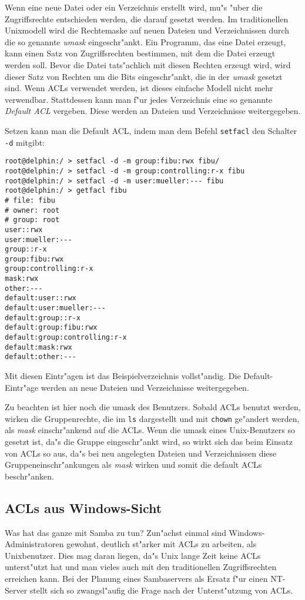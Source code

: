 \documentclass{scrartcl}\usepackage{pslatex}\typearea{12}
\newcommand{\prog}{\texttt}
\begin{document}
Wenn eine neue Datei oder ein Verzeichnis erstellt wird, mu"s "uber
die Zugriffsrechte entschieden werden, die darauf gesetzt werden. Im
traditionellen Unixmodell wird die Rechtemaske auf neuen Dateien und
Verzeichnissen durch die so genannte \emph{umask} eingeschr"ankt. Ein
Programm, das eine Datei erzeugt, kann einen Satz von Zugriffsrechten
bestimmen, mit dem die Datei erzeugt werden soll. Bevor die Datei
tats"achlich mit diesen Rechten erzeugt wird, wird dieser Satz von
Rechten um die Bits eingeschr"ankt, die in der \emph{umask} gesetzt
sind. Wenn ACLs verwendet werden, ist dieses einfache Modell nicht
mehr verwendbar. Stattdessen kann man f"ur jedes Verzeichnis eine
so genannte \emph{Default ACL} vergeben. Diese werden an Dateien und
Verzeichnisse weitergegeben.

Setzen kann man die Default ACL, indem man dem Befehl \prog{setfacl}
den Schalter \prog{-d} mitgibt:

\begin{verbatim}
root@delphin:/ > setfacl -d -m group:fibu:rwx fibu/
root@delphin:/ > setfacl -d -m group:controlling:r-x fibu
root@delphin:/ > setfacl -d -m user:mueller:--- fibu
root@delphin:/ > getfacl fibu
# file: fibu
# owner: root
# group: root
user::rwx
user:mueller:---
group::r-x
group:fibu:rwx
group:controlling:r-x
mask:rwx
other:---
default:user::rwx
default:user:mueller:---
default:group::r-x
default:group:fibu:rwx
default:group:controlling:r-x
default:mask:rwx
default:other:---
\end{verbatim}

Mit diesen Eintr"agen ist das Beispielverzeichnis vollst"andig. Die
Default-Eintr"age werden an neue Dateien und Verzeichnisse
weitergegeben. 

Zu beachten ist hier noch die umask des Benutzers. Sobald ACLs benutzt
werden, wirken die Gruppenrechte, die im \prog{ls} dargestellt und mit
\prog{chown} ge"andert werden, als \emph{mask} einschr"ankend auf die
ACLs. Wenn die umask eines Unix-Benutzers so gesetzt ist, da"s die
Gruppe eingeschr"ankt wird, so wirkt sich das beim Einsatz von ACLs so
aus, da"s bei neu angelegten Dateien und Verzeichnissen diese
Gruppeneinschr"ankungen als \emph{mask} wirken und somit die default
ACLs beschr"anken.

\subsection{ACLs aus Windows-Sicht}

Was hat das ganze mit Samba zu tun? Zun"achst einmal sind
Windows-Administratoren gewohnt, deutlich st"arker mit ACLs zu
arbeiten, als Unixbenutzer. Dies mag daran liegen, da"s Unix lange
Zeit keine ACLs unterst"utzt hat und man vieles auch mit den
traditionellen Zugriffsrechten erreichen kann. Bei der Planung eines
Sambaservers als Ersatz f"ur einen NT-Server stellt sich so
zwangsl"aufig die Frage nach der Unterst"utzung von ACLs.
\end{document}
